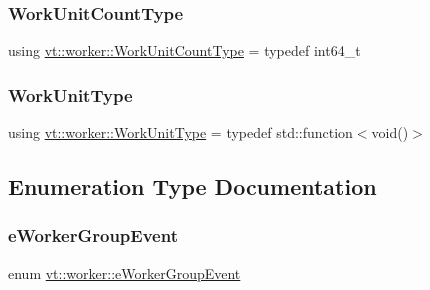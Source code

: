 \mbox{\label{namespacevt_1_1worker_a8080c49350b0520151601a8b24d6c6cf}} 
\subsubsection{\texorpdfstring{Work\+Unit\+Count\+Type}{WorkUnitCountType}}
{\footnotesize\ttfamily using \hyperlink{namespacevt_1_1worker_a8080c49350b0520151601a8b24d6c6cf}{vt\+::worker\+::\+Work\+Unit\+Count\+Type} = typedef int64\+\_\+t}

\mbox{\label{namespacevt_1_1worker_a59d2fcdafa81fc0af7f921a258e42202}} 
\subsubsection{\texorpdfstring{Work\+Unit\+Type}{WorkUnitType}}
{\footnotesize\ttfamily using \hyperlink{namespacevt_1_1worker_a59d2fcdafa81fc0af7f921a258e42202}{vt\+::worker\+::\+Work\+Unit\+Type} = typedef std\+::function$<$void()$>$}



\subsection{Enumeration Type Documentation}
\mbox{\label{namespacevt_1_1worker_abcb798436f1cdc4fab035def5b912d1f}} 
\subsubsection{\texorpdfstring{e\+Worker\+Group\+Event}{eWorkerGroupEvent}}
{\footnotesize\ttfamily enum \hyperlink{namespacevt_1_1worker_abcb798436f1cdc4fab035def5b912d1f}{vt\+::worker\+::e\+Worker\+Group\+Event}}

